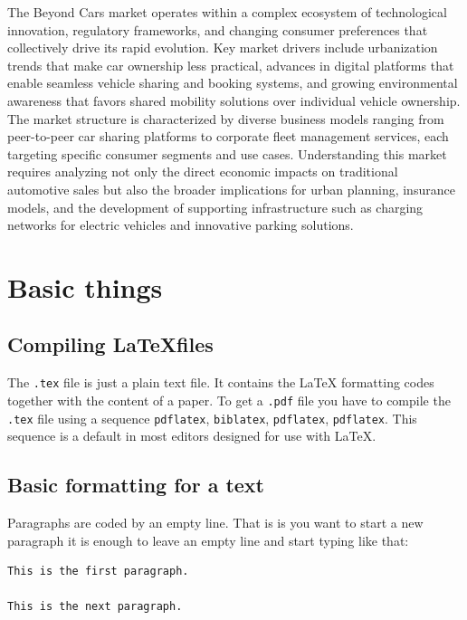 \documentclass[english, twoside, 12pt, a4paper]{article}
\theoremstyle{definition}
\theoremstyle{plain}
\theoremstyle{remark}
\begin{document}
The Beyond Cars market operates within a complex ecosystem of technological innovation, regulatory frameworks, and changing consumer preferences that collectively drive its rapid evolution. Key market drivers include urbanization trends that make car ownership less practical, advances in digital platforms that enable seamless vehicle sharing and booking systems, and growing environmental awareness that favors shared mobility solutions over individual vehicle ownership. The market structure is characterized by diverse business models ranging from peer-to-peer car sharing platforms to corporate fleet management services, each targeting specific consumer segments and use cases. Understanding this market requires analyzing not only the direct economic impacts on traditional automotive sales but also the broader implications for urban planning, insurance models, and the development of supporting infrastructure such as charging networks for electric vehicles and innovative parking solutions.



\clearpage
\section{Basic things}

\subsection{Compiling \LaTeX files}

The \verb+.tex+ file is just a plain text file. It contains the \LaTeX{} formatting codes together with the content of a paper. To get a \verb+.pdf+ file you have to compile the \verb+.tex+ file using a sequence \verb+pdflatex+, \verb+biblatex+, \verb+pdflatex+, \verb+pdflatex+. This sequence is a default in most editors designed for use with \LaTeX.

\subsection{Basic formatting for a text}

Paragraphs are coded by an empty line. That is is you want to start a new paragraph it is enough to leave an empty line and start typing like that:
\begin{verbatim}
This is the first paragraph.

This is the next paragraph.
\end{verbatim}
\end{document}
